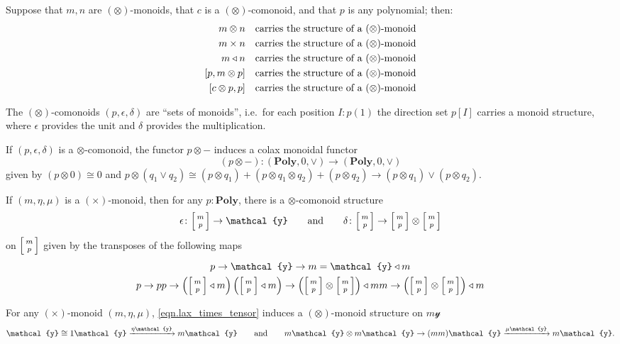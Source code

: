 \documentclass[11pt, one side, article]{memoir}
\makeatletter
\theoremstyle{definition}
\theoremstyle{plain}
\newcommand{\Cat}[1]{\mathbf{#1}}%
\newcommand{\To}[2][]{\xrightarrow[#1]{\tn{$#2$}}}
\newcommand{\tn}[1]{\textnormal{#1}}
\newcommand{\yon}{{\mathcal{y}}}
\newcommand{\poly}{\Cat{Poly}}
\newcommand{\0}{\textsf{0}}
\newcommand{\1}{\tn{\textsf{1}}}
\newcommand{\tri}{\mathbin{\triangleleft}}
\newcommand{\biglens}[2]{
     \begin{bmatrix}{\vphantom{f_f^f}#2} \\ {\vphantom{f_f^f}#1} \end{bmatrix}
}
\newcommand{\littlelens}[2]{
     \begin{bsmallmatrix}{\vphantom{f}#2} \\ {\vphantom{f}#1} \end{bsmallmatrix}
}
\newcommand{\lens}[2]{
  \relax\if@display
     \biglens{#1}{#2}
  \else
     \littlelens{#1}{#2}
  \fi
}
\newcommand{\hh}[2][]{#1 \tn{#2} #1}
\newcommand{\qqand}{\hh[\qquad]{and}}
\makeatother
\begin{document}
Suppose that $m,n$ are $(\otimes)$-monoids, that $c$ is a $(\otimes)$-comonoid, and that $p$ is any polynomial; then:
\begin{align}
	m\otimes n&\quad\tn{carries the structure of a $(\otimes)$-monoid}\\
	m\times n&\quad\tn{carries the structure of a $(\otimes)$-monoid}\\
	m\tri n&\quad\tn{carries the structure of a $(\otimes)$-monoid}\\
	[p, m\otimes p]&\quad\tn{carries the structure of a $(\otimes)$-monoid}\\
	[c\otimes p, p]&\quad\tn{carries the structure of a $(\otimes)$-monoid}
\end{align}
 

The $(\otimes)$-comonoids $(p,\epsilon,\delta)$ are ``sets of monoids'', i.e.\ for each position $I:p(1)$ the direction set $p[I]$ carries a monoid structure, where $\epsilon$ provides the unit and $\delta$ provides the multiplication.

If $(p,\epsilon,\delta)$ is a $\otimes$-comonoid, the functor $p\otimes-$ induces a colax monoidal functor
\begin{equation}
	(p\otimes -)\colon(\poly,0,\vee)\to(\poly,0,\vee)
\end{equation}
given by $(p\otimes 0)\cong0$ and $p\otimes (q_1\vee q_2)\cong(p\otimes q_1)+(p\otimes q_1\otimes q_2)+(p\otimes q_2)\to(p\otimes q_1)\vee(p\otimes q_2)$.

If $(m,\eta,\mu)$ is a $(\times)$-monoid, then for any $p:\poly$, there is a $\otimes$-comonoid structure
\begin{equation}
	\epsilon\colon\lens{p}{m}\to\yon
	\qqand
	\delta\colon\lens{p}{m}\to\lens{p}{m}\otimes\lens{p}{m}
\end{equation}
on $\lens{p}{m}$ given by the transposes of the following maps
\begin{gather}
	p\to \yon\to m=\yon\tri m\\
	p\to pp\to\left(\lens{p}{m}\tri m\right)\left(\lens{p}{m}\tri m\right)\to\left(\lens{p}{m}\otimes\lens{p}{m}\right)\tri mm\to\left(\lens{p}{m}\otimes\lens{p}{m}\right)\tri m
\end{gather}

For any $(\times)$-monoid $(m,\eta,\mu)$, \eqref{eqn.lax_times_tensor} induces a $(\otimes)$-monoid structure on $m\yon$
\begin{equation}
	\yon\cong1\yon\To{\eta\yon} m\yon
	\qqand
	m\yon\otimes m\yon\to (mm)\yon\To{\mu\yon} m\yon.
\end{equation}
\end{document}
